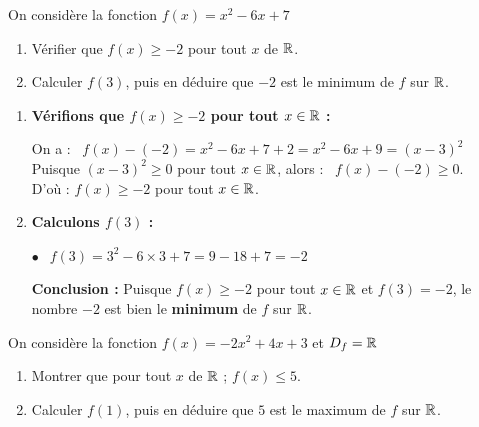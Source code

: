 \documentclass[10pt, a4paper]{article}
\begin{document}
\begin{Application}[][25 min]
On considère la fonction $f(x) = x^2 - 6x + 7$
\begin{enumerate}[leftmargin=*,itemsep=0.5pt]
    \item Vérifier que $f(x) \geq -2$ pour tout $x$ de $\mathbb{R}$.
    \item Calculer $f(3)$, puis en déduire que $-2$ est le minimum de $f$ sur $\mathbb{R}$.
\end{enumerate}
\end{Application}

\begin{Solution}[APPLICATION][13]
\begin{enumerate}[leftmargin=*,itemsep=0.5pt]
    \item \textbf{Vérifions que $f(x) \geq -2$ pour tout $x \in \mathbb{R}$ :}

    On a :~  $f(x) - (-2) = x^2 - 6x + 7 + 2 
                    = x^2 - 6x + 9 
                    = (x - 3)^2$ \\
    Puisque $(x-3)^2 \geq 0$ pour tout $x \in \mathbb{R}$, alors :~ $f(x) - (-2) \geq 0$. \\
    D'où : \quad $f(x) \geq -2$ pour tout $x \in \mathbb{R}$.

    \item \textbf{Calculons $f(3)$ :}

    $\bullet~~$ $f(3) = 3^2 - 6 \times 3 + 7 = 9 - 18 + 7 = -2$ 

    \textbf{Conclusion :}
    Puisque $f(x) \geq -2$ pour tout $x \in \mathbb{R}$ et $f(3) = -2$, le nombre $-2$ est bien le \textbf{minimum} de $f$ sur $\mathbb{R}$.
\end{enumerate}
\end{Solution}


\begin{Application}[][25 min]
On considère la fonction $f(x) = -2x^2 + 4x + 3$ et $D_f = \mathbb{R}$
\begin{enumerate}[leftmargin=*,itemsep=0.5pt]
    \item Montrer que pour tout $x$ de $\mathbb{R}$ ; $f(x) \leq 5$.
    \item Calculer $f(1)$, puis en déduire que $5$ est le maximum de $f$ sur $\mathbb{R}$.
\end{enumerate}
\end{Application}
\end{document}
